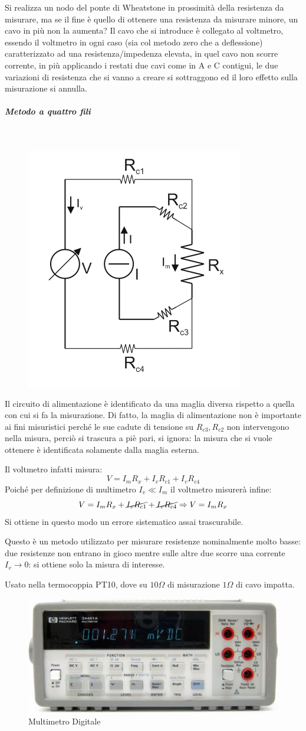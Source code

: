 \documentclass[a4paper, 15pt]{article}
\begin{document}
\begin{adjustwidth}{2in}{}
		Si realizza un nodo del ponte di Wheatstone in prossimità della resistenza da misurare, ma se il fine è quello di ottenere una resistenza da misurare minore, un cavo in più non la aumenta? Il cavo che si introduce è collegato al voltmetro, essendo il voltmetro in ogni caso (sia col metodo zero che a deflessione) caratterizzato ad una resistenza/impedenza elevata, in quel cavo non scorre corrente, in più applicando i restati due cavi come in A e C contigui, le due variazioni di resistenza che si vanno a creare si sottraggono ed il loro effetto sulla misurazione si annulla.  
\newpage		
		\subparagraph{Metodo a quattro fili} \mbox{} \\
		\begin{figure}[H]
			\centering
			\includegraphics[width=0.3\linewidth]{fig/screenshot022}
			\label{fig:screenshot022}
		\end{figure}
		Il circuito di alimentazione è identificato da una maglia diversa rispetto a quella con cui si fa la misurazione. Di fatto, la maglia di alimentazione non è importante ai fini misuristici perché le sue cadute di tensione su $ R_{c3}, R_{c2} $ non intervengono nella misura, perciò si trascura a piè pari, si ignora: la misura che si vuole ottenere è identificata solamente dalla maglia esterna. \newline 
		
		Il voltmetro infatti misura:
		\[V=I_mR_x+I_vR_{c1} + I_vR_{c4}\]
		Poiché per definizione di multimetro $I_v\ll I_m$ il voltmetro misurerà infine: 
		\[V=I_mR_x+\cancel{I_vR_{c1}} +\cancel{ I_vR_{c4}} \Rightarrow V=I_mR_x\]
		Si ottiene in questo modo un errore sistematico assai trascurabile. \newline 
		
		Questo è un metodo utilizzato per misurare resistenze nominalmente molto basse: due resistenze non entrano in gioco mentre sulle altre due scorre una corrente $I_v\rightarrow0$: si ottiene solo la misura di interesse. 
		
		Usato nella termocoppia PT10, dove su $10\Omega$ di misurazione $1\Omega$ di cavo impatta.  
\begin{figure}[H]
	\centering
	\includegraphics[width=0.5\linewidth]{fig/screenshot010}
	\caption{Multimetro Digitale}
	\label{fig:screenshot010.1}
\end{figure}
\end{adjustwidth}
\newpage
\end{document}
